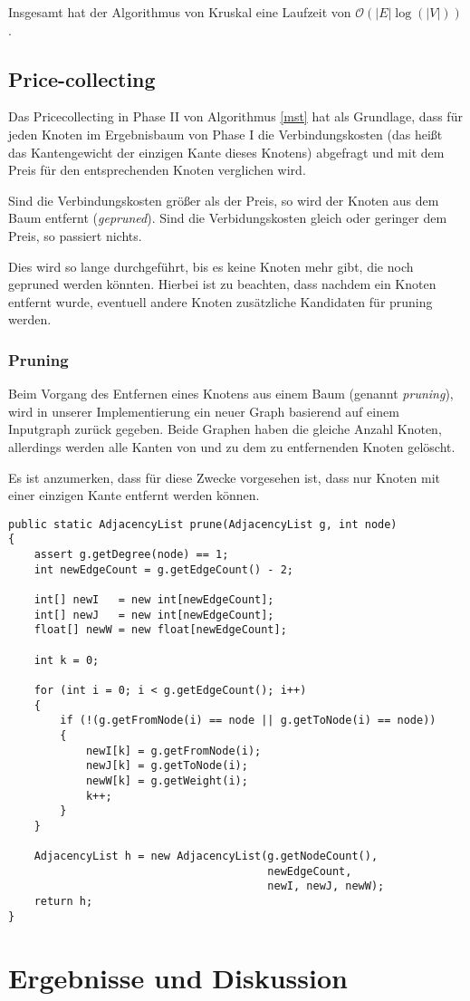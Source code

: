 \documentclass[a4paper,10pt]{article}
\begin{document}
Insgesamt hat der Algorithmus von Kruskal eine Laufzeit von $\mathcal{O}(|E|\log(|V|))$.

\subsection{Price-collecting}

Das Pricecollecting in Phase II von Algorithmus \ref{mst} hat als Grundlage, dass für jeden Knoten im Ergebnisbaum von Phase I die Verbindungskosten (das heißt das Kantengewicht der einzigen Kante dieses Knotens) abgefragt und mit dem Preis für den entsprechenden Knoten verglichen wird.

Sind die Verbindungskosten größer als der Preis, so wird der Knoten aus dem Baum entfernt (\emph{gepruned}). Sind die Verbidungskosten gleich oder geringer dem Preis, so passiert nichts.

Dies wird so lange durchgeführt, bis es keine Knoten mehr gibt, die noch gepruned werden könnten. Hierbei ist zu beachten, dass nachdem ein Knoten entfernt wurde, eventuell andere Knoten zusätzliche Kandidaten für pruning werden.

\subsubsection{Pruning}

Beim Vorgang des Entfernen eines Knotens aus einem Baum (genannt \emph{pruning}), wird in unserer Implementierung ein neuer Graph basierend auf einem Inputgraph zurück gegeben. Beide Graphen haben die gleiche Anzahl Knoten, allerdings werden alle Kanten von und zu dem zu entfernenden Knoten gelöscht.
\smallskip

Es ist anzumerken, dass für diese Zwecke vorgesehen ist, dass nur Knoten mit einer einzigen Kante entfernt werden können.
\bigskip

\begin{lstlisting}
public static AdjacencyList prune(AdjacencyList g, int node)
{
    assert g.getDegree(node) == 1;
    int newEdgeCount = g.getEdgeCount() - 2;
       
    int[] newI   = new int[newEdgeCount];
    int[] newJ   = new int[newEdgeCount];
    float[] newW = new float[newEdgeCount];
        
    int k = 0;
        
    for (int i = 0; i < g.getEdgeCount(); i++)
    {
        if (!(g.getFromNode(i) == node || g.getToNode(i) == node))
        {
            newI[k] = g.getFromNode(i);
            newJ[k] = g.getToNode(i);
            newW[k] = g.getWeight(i);
            k++;
        }
    }
       
    AdjacencyList h = new AdjacencyList(g.getNodeCount(), 
                                        newEdgeCount,
                                        newI, newJ, newW);
    return h;
}
\end{lstlisting}

\section{Ergebnisse und Diskussion}



\end{document}
